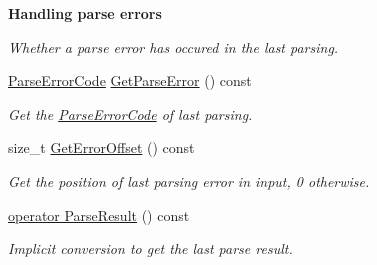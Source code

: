 \begin{Indent}{\bf Handling parse errors}
\begin{DoxyCompactItemize}
\begin{DoxyCompactList}\small\item\em Whether a parse error has occured in the last parsing. \end{DoxyCompactList}\item 
\hyperlink{group___r_a_p_i_d_j_s_o_n___e_r_r_o_r_s_ga8d4b32dfc45840bca189ade2bbcb6ba7}{Parse\+Error\+Code} \hyperlink{class_generic_document_aab4771355aa3c6e5368da3ae36f38cc1}{Get\+Parse\+Error} () const \hypertarget{class_generic_document_aab4771355aa3c6e5368da3ae36f38cc1}{}\label{class_generic_document_aab4771355aa3c6e5368da3ae36f38cc1}

\begin{DoxyCompactList}\small\item\em Get the \hyperlink{group___r_a_p_i_d_j_s_o_n___e_r_r_o_r_s_ga8d4b32dfc45840bca189ade2bbcb6ba7}{Parse\+Error\+Code} of last parsing. \end{DoxyCompactList}\item 
size\+\_\+t \hyperlink{class_generic_document_a2db6ad11d157342f725470fb898b6712}{Get\+Error\+Offset} () const \hypertarget{class_generic_document_a2db6ad11d157342f725470fb898b6712}{}\label{class_generic_document_a2db6ad11d157342f725470fb898b6712}

\begin{DoxyCompactList}\small\item\em Get the position of last parsing error in input, 0 otherwise. \end{DoxyCompactList}\item 
\hyperlink{class_generic_document_a12ce1db7b06e2565b6abb2112a681c71}{operator Parse\+Result} () const 
\begin{DoxyCompactList}\small\item\em Implicit conversion to get the last parse result. \end{DoxyCompactList}\end{DoxyCompactItemize}
\end{Indent}
